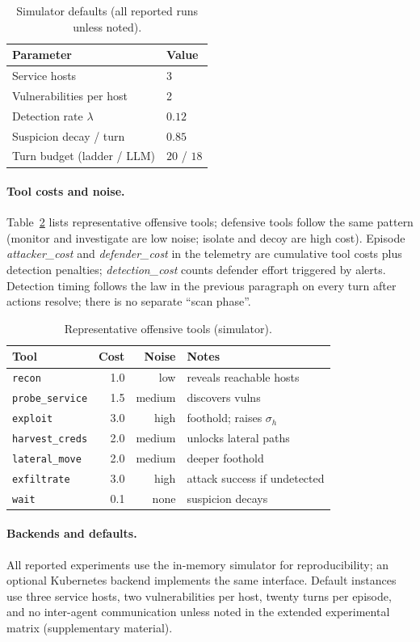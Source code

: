 \begin{table}[!t]
\caption{Simulator defaults (all reported runs unless noted).}
\label{tab:sim-params}
\centering
\setlength{\tabcolsep}{4pt}
\small
\begin{tabular}{@{}ll@{}}
\toprule
\textbf{Parameter} & \textbf{Value} \\
\midrule
Service hosts & 3 \\
Vulnerabilities per host & 2 \\
Detection rate $\lambda$ & $0.12$ \\
Suspicion decay / turn & $0.85$ \\
Turn budget (ladder / LLM) & $20$ / $18$ \\
\bottomrule
\end{tabular}
\end{table}

\paragraph{Tool costs and noise.}
Table~\ref{tab:tool-costs} lists representative offensive tools; defensive
tools follow the same pattern (monitor and investigate are low noise;
isolate and decoy are high cost). Episode \emph{attacker\_cost} and
\emph{defender\_cost} in the telemetry are cumulative tool costs plus
detection penalties; \emph{detection\_cost} counts defender effort triggered
by alerts. Detection timing follows the law in the previous paragraph on
every turn after actions resolve; there is no separate ``scan phase''.

\begin{table}[!t]
\caption{Representative offensive tools (simulator).}
\label{tab:tool-costs}
\centering
\setlength{\tabcolsep}{3pt}
\footnotesize
\begin{tabular}{@{}lrrl@{}}
\toprule
\textbf{Tool} & \textbf{Cost} & \textbf{Noise} & \textbf{Notes} \\
\midrule
\texttt{recon} & 1.0 & low & reveals reachable hosts \\
\texttt{probe\_service} & 1.5 & medium & discovers vulns \\
\texttt{exploit} & 3.0 & high & foothold; raises $\sigma_h$ \\
\texttt{harvest\_creds} & 2.0 & medium & unlocks lateral paths \\
\texttt{lateral\_move} & 2.0 & medium & deeper foothold \\
\texttt{exfiltrate} & 3.0 & high & attack success if undetected \\
\texttt{wait} & 0.1 & none & suspicion decays \\
\bottomrule
\end{tabular}
\end{table}

\paragraph{Backends and defaults.}
All reported experiments use the in-memory simulator for reproducibility; an
optional Kubernetes backend implements the same interface. Default instances
use three service hosts, two vulnerabilities per host, twenty turns per
episode, and no inter-agent communication unless noted in the extended experimental
matrix (supplementary material).
